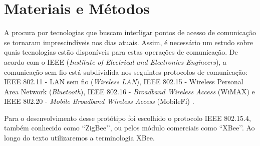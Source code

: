 \documentclass[12pt]{uftpibicsic2018}
\begin{document}
\chapter{Materiais e Métodos}\vskip -12pt

A procura por tecnologias que buscam interligar pontos de acesso de comunicação se tornaram imprescindíveis nos dias atuais. Assim, é necessário um estudo sobre quais tecnologias estão disponíveis para estas operações de comunicação. De acordo com o IEEE (\textit{Institute of Electrical and Electronics Engineers}), a comunicação sem fio está subdividida nos seguintes protocolos de comunicação: IEEE 802.11 - LAN sem fio ({\it Wireless LAN}), IEEE 802.15 - Wireless Personal Area Network ({\it Bluetooth}), IEEE 802.16 - {\it Broadband Wireless Access} (WiMAX) e IEEE 802.20 - {\it Mobile Broadband Wireless Access} (MobileFi) \cite{marcos}.

Para o desenvolvimento desse protótipo foi escolhido o protocolo IEEE 802.15.4, também conhecido como ``ZigBee’’, ou pelos módulo comerciais como ``XBee’’. Ao longo do texto utilizaremos a terminologia XBee.


%
%
\end{document}
